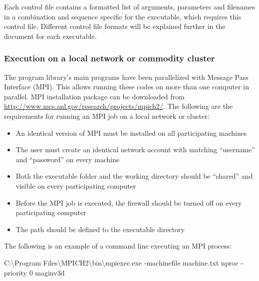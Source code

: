 Each control file contains a formatted list of arguments, parameters and filenames in a combination and sequence specific for the executable, which requires this control file. Different control file formats will be explained further in the document for each executable.

\subsubsection{Execution on a local network or commodity cluster}

The \prog program library's main programs have been parallelized with Message Pass Interface (MPI). This allows running these codes on more than one computer in parallel. MPI installation package can be downloaded from \url{http://www.mcs.anl.gov/research/projects/mpich2/}. The following are the requirements for running an MPI job on a local network or cluster:
\begin{itemize}
\item An identical version of MPI must be installed on all participating machines
\item The user must create an identical network account with matching ``username'' and ``password'' on every machine
\item Both the executable folder and the working directory should be ``shared'' and visible on every participating computer
\item Before the MPI job is executed, the firewall should be turned off on every participating computer
\item The path should be defined to the executable directory
\end{itemize}
%
The following is an example of a command line executing an MPI process:
\begin{fileExample}	
C:\textbackslash Program Files\textbackslash MPICH2\textbackslash bin\textbackslash mpiexec.exe -machinefile machine.txt nproc -priority 0 maginv3d
\end{fileExample}

